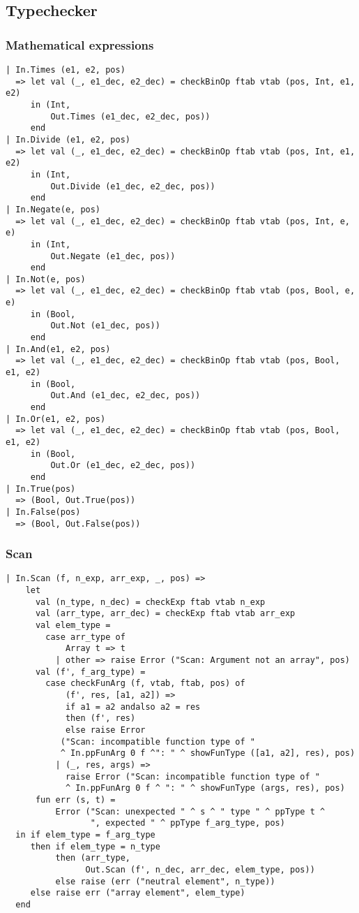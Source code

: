 \documentclass[12pt]{article}
\begin{document}
\subsection{Typechecker}
\subsubsection{Mathematical expressions}
\begin{verbatim}
| In.Times (e1, e2, pos)
  => let val (_, e1_dec, e2_dec) = checkBinOp ftab vtab (pos, Int, e1, e2)
     in (Int,
         Out.Times (e1_dec, e2_dec, pos))
     end
| In.Divide (e1, e2, pos)
  => let val (_, e1_dec, e2_dec) = checkBinOp ftab vtab (pos, Int, e1, e2)
     in (Int,
         Out.Divide (e1_dec, e2_dec, pos))
     end
| In.Negate(e, pos)
  => let val (_, e1_dec, e2_dec) = checkBinOp ftab vtab (pos, Int, e, e)
     in (Int,
         Out.Negate (e1_dec, pos))
     end
| In.Not(e, pos)
  => let val (_, e1_dec, e2_dec) = checkBinOp ftab vtab (pos, Bool, e, e)
     in (Bool,
         Out.Not (e1_dec, pos))
     end
| In.And(e1, e2, pos)
  => let val (_, e1_dec, e2_dec) = checkBinOp ftab vtab (pos, Bool, e1, e2)
     in (Bool,
         Out.And (e1_dec, e2_dec, pos))
     end
| In.Or(e1, e2, pos)
  => let val (_, e1_dec, e2_dec) = checkBinOp ftab vtab (pos, Bool, e1, e2)
     in (Bool,
         Out.Or (e1_dec, e2_dec, pos))
     end
| In.True(pos)
  => (Bool, Out.True(pos))
| In.False(pos)
  => (Bool, Out.False(pos))
\end{verbatim}
\subsubsection{Scan}
\begin{verbatim}
| In.Scan (f, n_exp, arr_exp, _, pos) =>
    let 
      val (n_type, n_dec) = checkExp ftab vtab n_exp
      val (arr_type, arr_dec) = checkExp ftab vtab arr_exp
      val elem_type =
        case arr_type of
            Array t => t
          | other => raise Error ("Scan: Argument not an array", pos)
      val (f', f_arg_type) =
        case checkFunArg (f, vtab, ftab, pos) of
            (f', res, [a1, a2]) =>
            if a1 = a2 andalso a2 = res
            then (f', res)
            else raise Error
           ("Scan: incompatible function type of "
           ^ In.ppFunArg 0 f ^": " ^ showFunType ([a1, a2], res), pos)
          | (_, res, args) =>
            raise Error ("Scan: incompatible function type of "
            ^ In.ppFunArg 0 f ^ ": " ^ showFunType (args, res), pos)
      fun err (s, t) =
          Error ("Scan: unexpected " ^ s ^ " type " ^ ppType t ^
                 ", expected " ^ ppType f_arg_type, pos)
  in if elem_type = f_arg_type
     then if elem_type = n_type
          then (arr_type,
                Out.Scan (f', n_dec, arr_dec, elem_type, pos))
          else raise (err ("neutral element", n_type))
     else raise err ("array element", elem_type)
  end
\end{verbatim}
\end{document}
